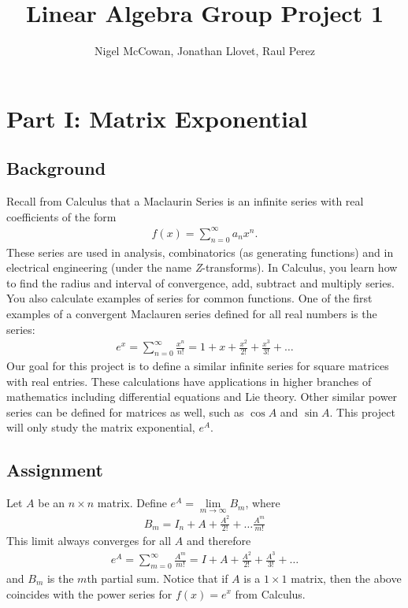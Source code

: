 \documentclass{article}
\begin{document}
\title{Linear Algebra Group Project 1}
\author{Nigel McCowan, Jonathan Llovet, Raul Perez}
\maketitle

\section{Part I: Matrix Exponential}

\subsection{Background}

Recall from Calculus that a Maclaurin Series is an infinite series with real coefficients of the form
\begin{align*}
  f(x) = \sum_{n=0}^{\infty} a_n x^n.
\end{align*}
These series are used in analysis, combinatorics (as generating functions) and in electrical engineering (under the name \emph{Z}-transforms). In Calculus, you learn how to find the radius and interval of convergence, add, subtract and multiply series. You also calculate examples of series for common functions. One of the first examples of a convergent Maclauren series defined for all real numbers is the series:
\begin{align*}
  e^x = \sum_{n=0}^{\infty} \frac{x^n}{n!} = 1 + x + \frac{x^2}{2!} + \frac{x^3}{3!} + \ldots
\end{align*}
Our goal for this project is to define a similar infinite series for square matrices with real entries. These calculations have applications in higher branches of mathematics including differential equations and Lie theory. Other similar power series can be defined for matrices as well, such as $\cos A$ and $\sin A$. This project will only study the matrix exponential, $e^A$.

\subsection{Assignment}

Let $A$ be an $n \times n$ matrix. Define $e^A = \lim\limits_{m \to \infty} B_m$, where
\begin{align*}
  B_m = I_n + A + \frac{A^2}{2!} + \ldots \frac{A^m}{m!}
\end{align*}
This limit always converges for all $A$ and therefore
\begin{align*}
  e^A = \sum_{m=0}^{\infty} \frac{A^m}{m!} = I + A + \frac{A^2}{2!} + \frac{A^3}{3!} + \ldots
\end{align*}
and $B_m$ is the $m$th partial sum. Notice that if $A$ is a $1 \times 1$ matrix, then the above coincides with the power series for $f(x) = e^x$ from Calculus.
\end{document}
